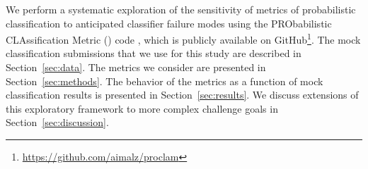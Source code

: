 We perform a systematic exploration of the sensitivity of metrics of probabilistic classification to anticipated classifier failure modes using the PRObabilistic CLAssification Metric (\proclam) code \citep{malz_proclam_2018}, which is publicly available on GitHub\footnote{\url{https://github.com/aimalz/proclam}}.
The mock classification submissions that we use for this study are described in Section~\ref{sec:data}.
The metrics we consider are presented in Section~\ref{sec:methods}.
The behavior of the metrics as a function of mock classification results is presented in Section~\ref{sec:results}.
We discuss extensions of this exploratory framework to more complex challenge goals in Section~\ref{sec:discussion}.
